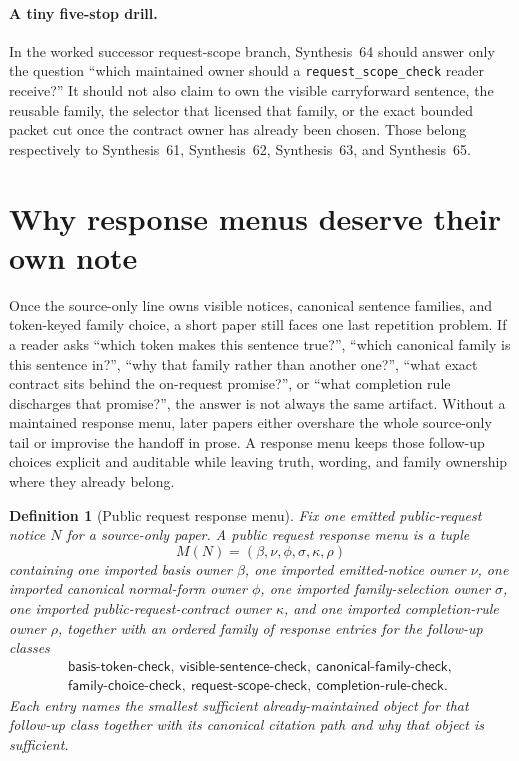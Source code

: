 \documentclass[11pt]{article}
\newtheorem{definition}{Definition}
\begin{document}
\paragraph{A tiny five-stop drill.}
In the worked successor request-scope branch, Synthesis~64 should answer only the question ``which maintained owner should a \nolinkurl{request_scope_check} reader receive?'' It should not also claim to own the visible carryforward sentence, the reusable family, the selector that licensed that family, or the exact bounded packet cut once the contract owner has already been chosen. Those belong respectively to Synthesis~61, Synthesis~62, Synthesis~63, and Synthesis~65.

\section{Why response menus deserve their own note}
Once the source-only line owns visible notices, canonical sentence families, and token-keyed family choice, a short paper still faces one last repetition problem.
If a reader asks ``which token makes this sentence true?'', ``which canonical family is this sentence in?'', ``why that family rather than another one?'', ``what exact contract sits behind the on-request promise?'', or ``what completion rule discharges that promise?'', the answer is not always the same artifact.
Without a maintained response menu, later papers either overshare the whole source-only tail or improvise the handoff in prose.
A response menu keeps those follow-up choices explicit and auditable while leaving truth, wording, and family ownership where they already belong.

\begin{definition}[Public request response menu]
Fix one emitted public-request notice $N$ for a source-only paper.
A \emph{public request response menu} is a tuple
\[
M(N)=(\beta,\nu,\phi,\sigma,\kappa,\rho)
\]
containing one imported basis owner $\beta$, one imported emitted-notice owner $\nu$, one imported canonical normal-form owner $\phi$, one imported family-selection owner $\sigma$, one imported public-request-contract owner $\kappa$, and one imported completion-rule owner $\rho$, together with an ordered family of response entries for the follow-up classes
\[
\begin{array}{l}
\textsf{basis-token-check},\ \textsf{visible-sentence-check},\ \textsf{canonical-family-check},\\
\textsf{family-choice-check},\ \textsf{request-scope-check},\ \textsf{completion-rule-check}.
\end{array}
\]
Each entry names the smallest sufficient already-maintained object for that follow-up class together with its canonical citation path and why that object is sufficient.
\end{definition}
\end{document}
